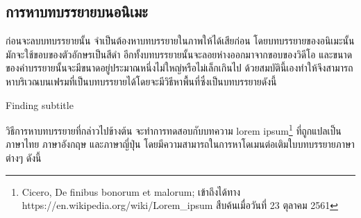     \subsection{การหาบทบรรยายบนอนิเมะ}	
	\hspace{1cm}ก่อนจะลบบทบรรยายนั้น จำเป็นต้องหาบทบรรยายในภาพให้ได้เสียก่อน โดยบทบรรยายของอนิเมะนั้น มักจะใช้ขอบของตัวอักษรเป็นสีดำ อีกทั้งบทบรรยายนั้นจะลอยห่างออกมาจากขอบของวิดีโอ และขนาดของคำบรรยายนั้นจะมีขนาดอยู่ประมาณหนึ่งไม่ใหญ่หรือไม่เล็กเกินไป ด้วยสมบัตินี้เองทำให้จึงสามารถหาบริเวณบนเฟรมที่เป็นบทบรรยายได้โดยจะมีวิธีหาพื้นที่ซึ่งเป็นบทบรรยายดังนี้
	
	\vspace{1cm}
	
	\begin{algorithm}[H]
		\caption{Finding subtitle}
		\SetAlgoNoLine
    \end{algorithm}
    
    \hspace{1cm} วิธีการหาบทบรรยายที่กล่าวไปข้างต้น จะทำการทดสอบกับบทความ lorem ipsum\footnote{Cicero, De finibus bonorum et malorum; เข้าถึงได้ทาง https://en.wikipedia.org/wiki/Lorem\_ipsum สืบค้นเมื่อวันที่ 23 ตุลาคม 2561} ที่ถูกแปลเป็นภาษาไทย ภาษาอังกฤษ และภาษาญี่ปุ่น โดยมีความสามารถในการหาโดเมนต่อเติมใบบทบรรยายภาษาต่างๆ ดังนี้
    
